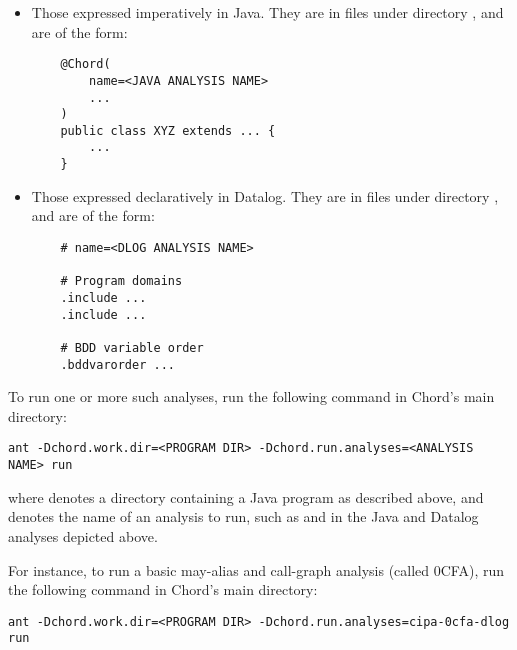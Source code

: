 \begin{itemize}
\item
Those expressed imperatively in Java. They are in  files under
directory , and are of the form:

\begin{framed}
\begin{verbatim}
    @Chord(
        name=<JAVA ANALYSIS NAME>
        ...
    )
    public class XYZ extends ... {
        ...
    }
\end{verbatim}
\end{framed}

\item

Those expressed declaratively in Datalog.  They are in  files under
directory , and are of the form:

\begin{framed}
\begin{verbatim}
    # name=<DLOG ANALYSIS NAME>

    # Program domains
    .include ...
    .include ...

    # BDD variable order
    .bddvarorder ...
\end{verbatim}
\end{framed}
\end{itemize}

To run one or more such analyses, run the following command in Chord's main directory:

\begin{framed}
\begin{verbatim}
ant -Dchord.work.dir=<PROGRAM DIR> -Dchord.run.analyses=<ANALYSIS NAME> run
\end{verbatim}
\end{framed}

where {\tt <PROGRAM DIR>} denotes a directory containing a Java program as described above,
and {\tt <ANALYSIS NAME>} denotes the name of an analysis to run,
such as {\tt <JAVA ANALYSIS NAME>} and {\tt <DLOG ANALYSIS NAME>} in the Java and
Datalog analyses depicted above.

For instance, to run a basic may-alias and call-graph analysis (called 0CFA),
run the following command in Chord's main directory:

\begin{framed}
\begin{verbatim}
ant -Dchord.work.dir=<PROGRAM DIR> -Dchord.run.analyses=cipa-0cfa-dlog run
\end{verbatim}
\end{framed}

